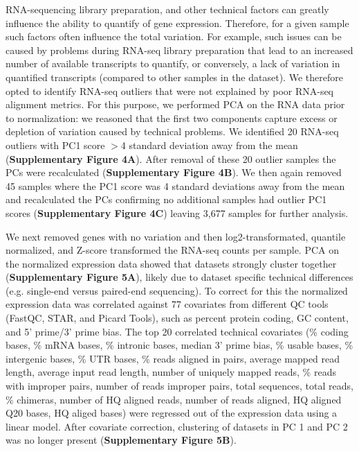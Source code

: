 RNA-sequencing library preparation, and other technical factors can greatly influence the ability to quantify of gene expression. Therefore, for a given sample such factors often influence the total variation. For example, such issues can be caused by problems during RNA-seq library preparation that lead to an increased number of available transcripts to quantify, or conversely, a lack of variation in quantified transcripts (compared to other samples in the dataset). We therefore opted to identify RNA-seq outliers that were not explained by poor RNA-seq alignment metrics. For this purpose, we performed PCA on the RNA data prior to normalization: we reasoned that the first two components capture excess or depletion of variation caused by technical problems. We identified 20 RNA-seq outliers with PC1 score $>$4 standard deviation away from the mean (\textbf{Supplementary Figure 4A}). After removal of these 20 outlier samples the PCs were recalculated (\textbf{Supplementary Figure 4B}). We then again removed 45 samples where the PC1 score was 4 standard deviations away from the mean and recalculated the PCs confirming no additional samples had outlier PC1 scores (\textbf{Supplementary Figure 4C}) leaving 3,677 samples for further analysis. 

We next removed genes with no variation and then log2-transformated, quantile normalized, and Z-score transformed the RNA-seq counts per sample. PCA on the normalized expression data showed that datasets strongly cluster together (\textbf{Supplementary Figure 5A}), likely due to dataset specific technical differences (e.g. single-end versus paired-end sequencing). To correct for this the normalized expression data was correlated against 77 covariates from different QC tools (FastQC\cite{BabrahamBioinformaticsFastQC}, STAR\cite{dobinSTARUltrafastUniversal2013}, and Picard Tools\cite{broadinstitutePicardTools2019}), such as percent protein coding, GC content, and 5’ prime/3’ prime bias. The top 20 correlated technical covariates (\% coding bases, \% mRNA bases, \% intronic bases, median 3’ prime bias, \% usable bases, \% intergenic bases, \% UTR bases, \% reads aligned in pairs, average mapped read length, average input read length, number of uniquely mapped reads, \% reads with improper pairs, number of reads improper pairs, total sequences, total reads, \% chimeras, number of HQ aligned reads, number of reads aligned, HQ aligned Q20 bases, HQ aliged bases) were regressed out of the expression data using a linear model. After covariate correction, clustering of datasets in PC 1 and PC 2 was no longer present (\textbf{Supplementary Figure 5B}).  

